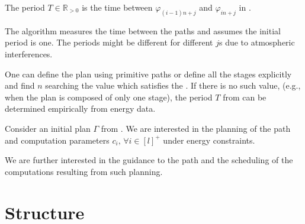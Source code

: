 \begin{highlight}
\begin{defn}[Period]\label{def:period}
  The period $T\in\mathbb{R}_{> 0}$ is the time between $\varphi_{(i-1)n+j}$ and $\varphi_{in+j}$ in .
\end{defn} 
\end{highlight}

The algorithm measures the time between the paths and assumes the initial period is one. The periods might be different for different $j$s due to atmospheric interferences.

One can define the plan using primitive paths or define all the stages explicitly and find $n$ searching the value which satisfies the . If there is no such value, (e.g., when the plan is composed of only one stage), the period $T$ from  can be determined empirically from energy data.

\begin{highlight}
\begin{pb}\label{pb}
  Consider an initial plan $\Gamma$ from . We are interested in the planning of the path and computation parameters $c_i,\,\forall i\in[l]^+$ under energy constraints.
  
We are further interested in the guidance to the path and the scheduling of the computations resulting from such planning.
\end{pb}    
\end{highlight}

\section{\color{red}Structure}
\label{sec:structure}

